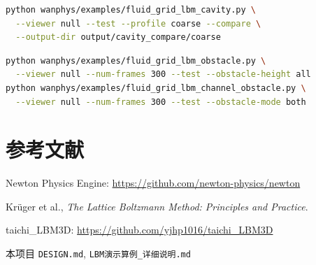 \documentclass[UTF8,a4paper,11pt]{ctexart}
\begin{document}
\begin{lstlisting}[language=bash,caption={BGK/MRT 对比（答辩推荐 coarse）}]
python wanphys/examples/fluid_grid_lbm_cavity.py \
  --viewer null --test --profile coarse --compare \
  --output-dir output/cavity_compare/coarse
\end{lstlisting}

\begin{lstlisting}[language=bash,caption={绕障}]
python wanphys/examples/fluid_grid_lbm_obstacle.py \
  --viewer null --num-frames 300 --test --obstacle-height all
python wanphys/examples/fluid_grid_lbm_channel_obstacle.py \
  --viewer null --num-frames 300 --test --obstacle-mode both
\end{lstlisting}

\section{参考文献}
\begin{enumerate}[label={[\arabic*]}]
  \item Newton Physics Engine: \url{https://github.com/newton-physics/newton}
  \item Kr\"uger et al., \textit{The Lattice Boltzmann Method: Principles and Practice}.
  \item taichi\_LBM3D: \url{https://github.com/yjhp1016/taichi_LBM3D}
  \item 本项目 \texttt{DESIGN.md}, \texttt{LBM演示算例\_详细说明.md}
\end{enumerate}
\end{document}

